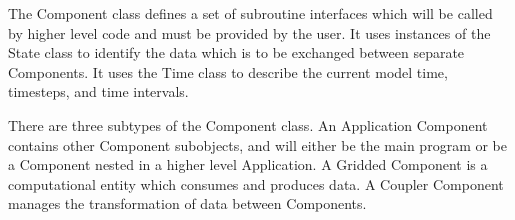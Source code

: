 %


The Component class defines a set of subroutine interfaces which
will be called by higher level code and must be provided by the user.
It uses instances of the State class to identify the data which is
to be exchanged between separate Components.  It uses the Time class
to describe the current model time, timesteps, and time intervals.


There are three subtypes of the Component class.  An Application
Component contains other Component subobjects, and will either be
the main program or be a Component nested in a higher level
Application.  A Gridded Component is a computational entity which
consumes and produces data.  A Coupler Component manages the
transformation of data between Components.


